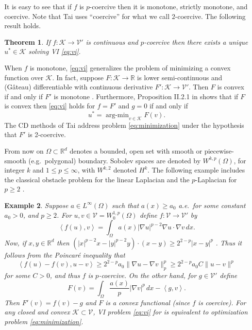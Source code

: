\documentclass[letterpaper,final,12pt,reqno]{amsart}
\theoremstyle{cstyle}
\newtheorem{theorem}{Theorem}
\theoremstyle{cstyle*}
\theoremstyle{dstyle}
\newtheorem{example}[theorem]{Example}
\numberwithin{equation}{section}
\numberwithin{figure}{section}
\numberwithin{table}{section}
\numberwithin{theorem}{section}
\newcommand{\RR}{\mathbb{R}}
\newcommand{\grad}{\nabla}
\newcommand{\cK}{\mathcal{K}}
\newcommand{\cV}{\mathcal{V}}
\newcommand{\ip}[2]{\left<#1,#2\right>}
\begin{document}
It is easy to see that if $f$ is $p$-coercive then it is monotone, strictly monotone, and coercive.  Note that Tai \cite{Tai2003} uses ``coercive'' for what we call $2$-coercive.  The following result holds.

\begin{theorem}  \label{thm:viwellposed}  If $f:\cK \to \cV'$ is continuous and $p$-coercive then there exists a unique $u^*\in \cK$ solving VI \eqref{eq:vi}.
\end{theorem}

When $f$ is monotone, \eqref{eq:vi} generalizes the problem of minimizing a convex function over $\cK$.  In fact, suppose $F:\cK \to \RR$ is lower semi-continuous and (G\^ateau) differentiable with continuous derivative $F':\cK \to \cV'$.  Then $F$ is convex if and only if $F'$ is monotone \cite[Proposition I.5.5]{EkelandTemam1976}.  Furthermore, Proposition II.2.1 in \cite{EkelandTemam1976} shows that if $F$ is convex then \eqref{eq:vi} holds for $f=F'$ and $g=0$ if and only if
\begin{equation}
u^* = \operatorname{arg-min}_{v\in\cK} F(v). \label{eq:minimization}
\end{equation}
The CD methods of Tai \cite{Tai2003} address problem \eqref{eq:minimization} under the hypothesis that $F'$ is 2-coercive.

From now on $\Omega \subset \RR^d$ denotes a bounded, open set with smooth or piecewise-smooth (e.g.~polygonal) boundary.  Sobolev spaces \cite{Evans2010} are denoted by $W^{k,p}(\Omega)$, for integer $k$ and $1\le p \le \infty$, with $W^{k,2}$ denoted $H^k$.  The following example includes the classical obstacle problem for the linear Laplacian \cite{GraeserKornhuber2009} and the $p$-Laplacian for $p\ge 2$ \cite{ChoeLewis1991}.

\begin{example}  \label{ex:plaplacian}  Suppose $a\in L^\infty(\Omega)$ such that $a(x)\ge a_0$ a.e.~for some constant $a_0>0$, and $p\ge 2$.  For $u,v \in \cV = W^{1,p}_0(\Omega)$ define $f:\cV \to \cV'$ by
\begin{equation}
\ip{f(u)}{v} = \int_\Omega a(x) |\grad u|^{p-2} \grad u \cdot \grad v\,dx. \label{eq:plaplacian}
\end{equation}
Now, if $x,y\in\RR^d$ then $(|x|^{p-2} x - |y|^{p-2} y)\cdot (x-y) \ge 2^{2-p} |x-y|^p$ \cite[see Appendix A and references therein]{Bueler2021conservation}.  Thus it follows from the Poincar\'e inequality that
    $$\ip{f(u) - f(v)}{u-v} \ge 2^{2-p} a_0 \|\grad u - \grad v\|_p^p \ge 2^{2-p} a_0 C \|u-v\|^p$$
for some $C>0$, and thus $f$ is $p$-coercive.  On the other hand, for $g\in\cV'$ define
    $$F(v) = \int_\Omega \frac{a(x)}{p} |\grad v|^p\,dx - \ip{g}{v}.$$
Then $F'(v) = f(v) - g$ and $F$ is a convex functional (since $f$ is coercive).  For any closed and convex $\cK\subset \cV$, VI problem \eqref{eq:vi} for is equivalent to optimization problem \eqref{eq:minimization}.\end{example}
\end{document}
